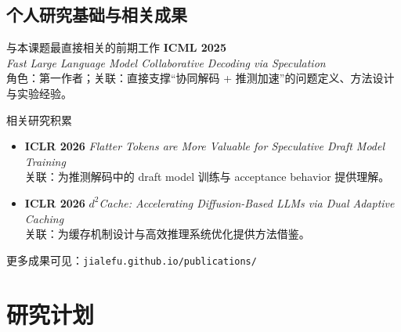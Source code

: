 \documentclass[8pt]{ctexbeamer}
\begin{document}
\subsection{个人研究基础与相关成果}
\begin{frame}{\insertsection}{\insertsubsection}
    \begin{block}{与本课题最直接相关的前期工作}
        \textbf{ICML 2025}\\
        \textit{Fast Large Language Model Collaborative Decoding via Speculation}\\
        角色：第一作者；关联：直接支撑“协同解码 + 推测加速”的问题定义、方法设计与实验经验。
    \end{block}

    \begin{block}{相关研究积累}
        \begin{itemize}
            \item \textbf{ICLR 2026} \textit{Flatter Tokens are More Valuable for Speculative Draft Model Training}\\
            关联：为推测解码中的 draft model 训练与 acceptance behavior 提供理解。
            \item \textbf{ICLR 2026} \textit{$d^2$Cache: Accelerating Diffusion-Based LLMs via Dual Adaptive Caching}\\
            关联：为缓存机制设计与高效推理系统优化提供方法借鉴。
        \end{itemize}
    \end{block}

    \begin{myquote}
        更多成果可见：\texttt{jialefu.github.io/publications/}
    \end{myquote}
\end{frame}

\section{研究计划}
\end{document}
